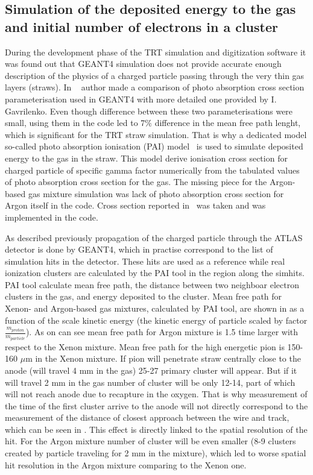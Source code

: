 \subsection{Simulation of the deposited energy to the gas and initial number of electrons in a cluster}
\label{subsec:pai_model}
During the development phase of the TRT simulation and digitization software it was found out that GEANT4 simulation does not provide accurate enough description of the physics
of a charged particle passing through the very thin gas layers (straws). 
In ~\cite{kittelmann_thesis} author made a comparison of photo absorption cross section parameterisation used in GEANT4 with more detailed one provided by I. Gavrilenko.
Even though difference between these two parameterisations were small, using them in the code led to 7$\%$ difference in the mean free path lenght, which is significant for the TRT straw simulation.
That is why a dedicated model so-called photo absorption ionisation (PAI) model~\cite{pai_model_paper} is used to simulate deposited energy to the gas in the straw.
This model derive ionisation cross section for charged particle of specific gamma factor numerically from the tabulated values of photo absorption cross section for the gas.
The missing piece for the Argon-based gas mixture simulation was lack of photo absorption cross section for Argon itself in the code.
Cross section reported in~\cite{argon_cross_section} was taken and was implemented in the code.

As described previously propagation of the charged particle through the ATLAS detector is done by GEANT4, which in practise correspond to the list of simulation hits in the detector.
These hits are used as a reference while real ionization clusters are calculated by the PAI tool in the region along the simhits.
PAI tool calculate mean free path, the distance between two neighboar electron clusters in the gas, and energy deposited to the cluster. 
Mean free path for Xenon- and Argon-based gas mixtures, calculated by PAI tool, are shown in  as a function of the scale kinetic energy 
(the kinetic energy of particle scaled by factor $\frac{m_{proton}}{m_{particle}}$). As on can see mean free path for Argon mixture is 1.5 time larger with respect to the Xenon mixture.
Mean free path for the high energetic pion is 150-160 $\mu$m in the Xenon mixture. If pion will penetrate straw centrally close to the anode (will travel 4 mm in the gas) 25-27 primary cluster will appear.
But if it will travel 2 mm in the gas number of cluster will be only 12-14, part of which will not reach anode due to recapture in the oxygen. 
That is why measurement of the time of the first cluster arrive to the anode will not directly correspond to the measurement of the distance of closest approach between the wire and track, 
which can be seen in . This effect is directly linked to the spatial resolution of the hit.
For the Argon mixture number of cluster will be even smaller (8-9 clusters created by particle traveling for 2 mm in the mixture), which led to worse spatial hit resolution in the Argon mixture comparing 
to the Xenon one.

